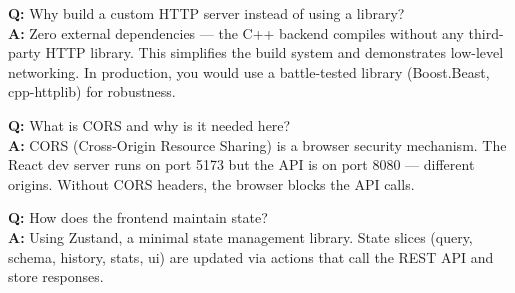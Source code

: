 \begin{interviewbox}
\textbf{Q:} Why build a custom HTTP server instead of using a library?\\[4pt]
\textbf{A:} Zero external dependencies --- the C++ backend compiles without any third-party HTTP library.  This simplifies the build system and demonstrates low-level networking.  In production, you would use a battle-tested library (Boost.Beast, cpp-httplib) for robustness.

\vspace{6pt}
\textbf{Q:} What is CORS and why is it needed here?\\[4pt]
\textbf{A:} CORS (Cross-Origin Resource Sharing) is a browser security mechanism.  The React dev server runs on port 5173 but the API is on port 8080 --- different origins.  Without CORS headers, the browser blocks the API calls.

\vspace{6pt}
\textbf{Q:} How does the frontend maintain state?\\[4pt]
\textbf{A:} Using Zustand, a minimal state management library.  State slices (query, schema, history, stats, ui) are updated via actions that call the REST API and store responses.
\end{interviewbox}
